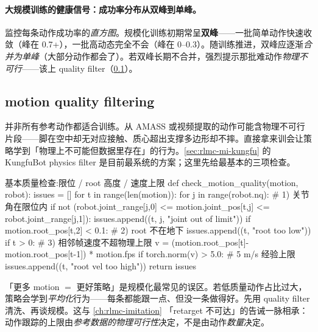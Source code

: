 \paragraph{大规模训练的健康信号：成功率分布从双峰到单峰。}监控每条动作成功率的\emph{直方图}。规模化训练初期常呈\textbf{双峰}——一批简单动作快速收敛（峰在 0.7+），一批高动态完全不会（峰在 0--0.3）。随训练推进，双峰应逐渐\emph{合并为单峰}（大部分动作都会了）。若双峰长期不合并，强烈提示那批难动作\emph{物理不可行}——该上 quality filter（\cref{sec:rlmc-mi-scale-filter}）。

\subsection{motion quality filtering}
\label{sec:rlmc-mi-scale-filter}

并非所有参考动作都适合训练。从 AMASS 或视频提取的动作可能含物理不可行片段——脚在空中却无对应接触、质心超出支撑多边形却不摔。直接拿来训会让策略学到「物理上不可能但数据里存在」的行为。\cref{sec:rlmc-mi-kungfu} 的 KungfuBot physics filter 是目前最系统的方案；这里先给最基本的三项检查。

\begin{codebox}[Python]{基本质量检查:限位 / root 高度 / 速度上限}
def check_motion_quality(motion, robot):
    issues = []
    for t in range(len(motion)):
        for j in range(robot.nq):                          # 1) 关节角在限位内
            if not (robot.joint_range[j,0] <= motion.joint_pos[t,j] <= robot.joint_range[j,1]):
                issues.append((t, j, "joint out of limit"))
        if motion.root_pos[t,2] < 0.1:                     # 2) root 不在地下
            issues.append((t, "root too low"))
        if t > 0:                                          # 3) 相邻帧速度不超物理上限
            v = (motion.root_pos[t]-motion.root_pos[t-1]) * motion.fps
            if torch.norm(v) > 5.0:                        # 5 m/s 经验上限
                issues.append((t, "root vel too high"))
    return issues
\end{codebox}

\begin{insight}[质量优先于数量]\label{ins:rlmc-mi-quality}
「更多 motion $=$ 更好策略」是规模化最常见的误区。若低质量动作占比过大，策略会学到\emph{平均化}行为——每条都能跟一点、但没一条做得好。先用 quality filter 清洗、再谈规模。这与 \cref{ch:rlmc-imitation} 「retarget 不可达」的告诫一脉相承：动作跟踪的上限由\emph{参考数据的物理可行性}决定，不是由动作\emph{数量}决定。
\end{insight}

